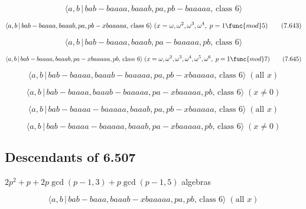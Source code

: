 \documentclass[10pt]{article}
\begin{document}
\begin{equation}
\langle a,b\,|\,bab-baaaa,baaab,pa,pb-baaaaa,\,\text{class }6\rangle 
\tag{7.642}
\end{equation}

\begin{equation}
\langle a,b\,|\,bab-baaaa,baaab,pa,pb-xbaaaaa,\,\text{class }6\rangle
\;(x=\omega ,\omega ^{2},\omega ^{3},\omega ^{4},\;p=1\func{mod}5) 
\tag{7.643}
\end{equation}

\begin{equation}
\langle a,b\,|\,bab-baaaa,baaab,pa-baaaaa,pb,\,\text{class }6\rangle 
\tag{7.644}
\end{equation}

\begin{equation}
\langle a,b\,|\,bab-baaaa,baaab,pa-xbaaaaa,pb,\,\text{class }6\rangle
\;(x=\omega ,\omega ^{2},\omega ^{3},\omega ^{4},\omega ^{5},\omega
^{6},\;p=1\func{mod}7)  \tag{7.645}
\end{equation}

\begin{equation}
\langle a,b\,|\,bab-baaaa,baaab-baaaaa,pa,pb-xbaaaaa,\,\text{class }6\rangle
\;(\text{all }x)  \tag{7.646}
\end{equation}

\begin{equation}
\langle a,b\,|\,bab-baaaa,baaab-baaaaa,pa-xbaaaaa,pb,\,\text{class }6\rangle
\;(x \neq 0)  \tag{7.647}
\end{equation}

\begin{equation}
\langle a,b\,|\,bab-baaaa-baaaaa,baaab,pa,pb-xbaaaaa,\,\text{class }6\rangle
\;(\text{all }x)  \tag{7.648}
\end{equation}

\begin{equation}
\langle a,b\,|\,bab-baaaa-baaaaa,baaab,pa-xbaaaaa,pb,\,\text{class }6\rangle
\;(x \neq 0)  \tag{7.649}
\end{equation}

\subsection{Descendants of 6.507}

$2p^{2}+p+2p\gcd (p-1,3)+p\gcd (p-1,5)$ algebras

\begin{equation}
\langle a,b\,|\,bab-baaa,baaab-xbaaaaa,pa,pb,\,\text{class }6\rangle \;(%
\text{all }x)  \tag{7.650}
\end{equation}
\end{document}

